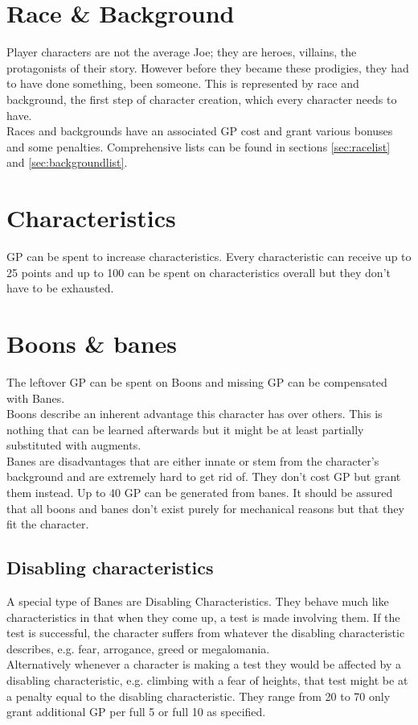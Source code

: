 \documentclass[12pt,a4paper,openany]{book}
\begin{document}
	\section{Race \& Background}
	Player characters are not the average Joe; they are heroes, villains, the protagonists of their story. However before they became these prodigies, they had to have done something, been someone. This is represented by race and background, the first step of character creation, which every character needs to have.\\
	Races and backgrounds have an associated GP cost and grant various bonuses and some penalties. Comprehensive lists can be found in sections \ref{sec:racelist} and \ref{sec:backgroundlist}.
	\section{Characteristics}
	GP can be spent to increase characteristics. Every characteristic can receive up to 25 points and up to 100 can be spent on characteristics overall but they don’t have to be exhausted.
	\section{Boons \& banes}
	The leftover GP can be spent on Boons and missing GP can be compensated with Banes.\\
	Boons describe an inherent advantage this character has over others. This is nothing that can be learned afterwards but it might be at least partially substituted with augments.\\
	Banes are disadvantages that are either innate or stem from the character’s background and are extremely hard to get rid of. They don’t cost GP but grant them instead. Up to 40 GP can be generated from banes. It should be assured that all boons and banes don’t exist purely for mechanical reasons but that they fit the character.
	\subsection{Disabling characteristics}
	A special type of Banes are Disabling Characteristics. They behave much like characteristics in that when they come up, a test is made involving them. If the test is successful, the character suffers from whatever the disabling characteristic describes, e.g. fear, arrogance, greed or megalomania.\\
	Alternatively whenever a character is making a test they would be affected by a disabling characteristic, e.g. climbing with a fear of heights, that test might be at a penalty equal to the disabling characteristic. They range from 20 to 70 only grant additional GP per full 5 or full 10 as specified.
\end{document}
